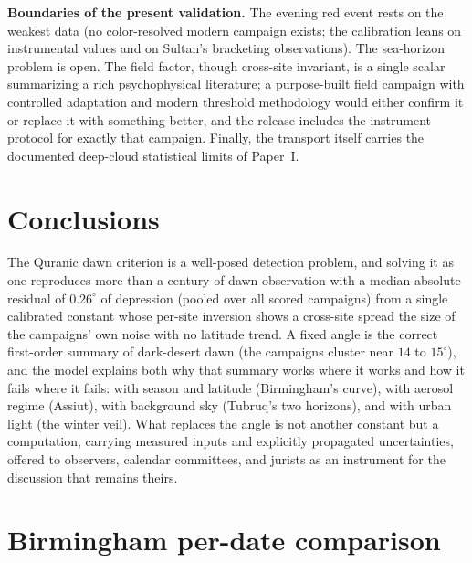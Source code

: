 \documentclass[preprint,12pt]{elsarticle}
\begin{document}
\textbf{Boundaries of the present validation.} The evening red event rests on the weakest data
(no color-resolved modern campaign exists; the calibration leans on
instrumental values and on Sultan's bracketing observations). The
sea-horizon problem is open. The field factor, though cross-site invariant,
is a single scalar summarizing a rich psychophysical literature; a
purpose-built field campaign with controlled adaptation and modern
threshold methodology would either confirm it or replace it with
something better, and the release includes the instrument protocol for
exactly that campaign. Finally, the transport itself carries the
documented deep-cloud statistical limits of Paper~I.

\section{Conclusions}
\label{sec:conclusion}

The Quranic dawn criterion is a well-posed detection problem, and
solving it as one reproduces more than a century of dawn observation
with a median absolute residual of $0.26^\circ$ of depression (pooled over
all scored campaigns) from a
single calibrated constant whose per-site inversion shows a cross-site
spread the size of the campaigns' own noise with no latitude trend. A
fixed angle is the correct first-order summary of dark-desert dawn
(the campaigns cluster near $14$ to $15^\circ$), and the model explains
both why that summary works where it works and how it fails where it
fails: with season and latitude (Birmingham's curve), with aerosol
regime (Assiut), with background sky (Tubruq's two horizons), and with
urban light (the winter veil). What replaces the angle is not another
constant but a computation, carrying measured inputs and explicitly
propagated uncertainties, offered to observers, calendar committees, and jurists as
an instrument for the discussion that remains theirs.

\appendix

\section{Birmingham per-date comparison}
\end{document}
